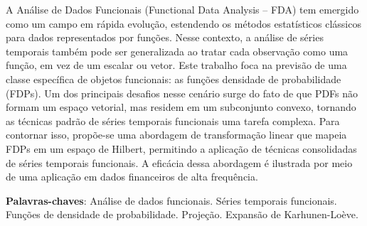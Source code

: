 \documentclass[
	12pt,				%
	oneside,			%
	a4paper,			%
	english,			%
	brazil				%
	]{abntex2ppgsi}
\begin{document}

\setlength{\absparsep}{18pt} %
\begin{resumo}

% 
%
% 
%

A Análise de Dados Funcionais (Functional Data Analysis – FDA) tem emergido como um campo em rápida evolução, estendendo os métodos estatísticos clássicos para dados representados por funções. Nesse contexto, a análise de séries temporais também pode ser generalizada ao tratar cada observação como uma função, em vez de um escalar ou vetor. Este trabalho foca na previsão de uma classe específica de objetos funcionais: as funções densidade de probabilidade (FDPs). Um dos principais desafios nesse cenário surge do fato de que PDFs não formam um espaço vetorial, mas residem em um subconjunto convexo, tornando as técnicas padrão de séries temporais funcionais uma tarefa complexa. Para contornar isso, propõe-se uma abordagem de transformação linear que mapeia FDPs em um espaço de Hilbert, permitindo a aplicação de técnicas consolidadas de séries temporais funcionais. A eficácia dessa abordagem é ilustrada por meio de uma aplicação em dados financeiros de alta frequência.

\textbf{Palavras-chaves}: Análise de dados funcionais. Séries temporais funcionais. Funções de densidade de probabilidade. Projeção. Expansão de Karhunen-Loève. 
\end{resumo}
\end{document}
